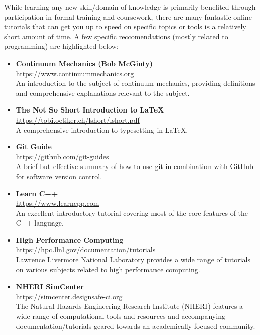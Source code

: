 \documentclass[12pt,a4paper,article,oneside]{memoir} %
\begin{document}
While learning any new skill/domain of knowledge is primarily benefited through participation in formal training and coursework, there are many fantastic online tutorials that can get you up to speed on specific topics or tools is a relatively short amount of time. A few specific reccomendations (mostly related to programming) are highlighted below:
\begin{itemize}
\item \textbf{Continuum Mechanics (Bob McGinty)} \\ \url{https://www.continuummechanics.org} \\ An introduction to the subject of continuum mechanics, providing definitions and comprehensive explanations relevant to the subject.
\item \textbf{The Not So Short Introduction to \LaTeX{}} \\ \url{https://tobi.oetiker.ch/lshort/lshort.pdf} \\ A comprehensive introduction to typesetting in \LaTeX{}.
\item \textbf{Git Guide} \\ \url{https://github.com/git-guides} \\ A brief but effective summary of how to use git in combination with GitHub for software version control.
\item \textbf{Learn C++} \\ \url{https://www.learncpp.com} \\ An excellent introductory tutorial covering most of the core features of the C++ language.
\item \textbf{High Performance Computing} \\ \url{https://hpc.llnl.gov/documentation/tutorials} \\ Lawrence Livermore National Laboratory provides a wide range of tutorials on various subjects related to high performance computing.
\item \textbf{NHERI SimCenter} \\ \url{https://simcenter.designsafe-ci.org} \\ The Natural Hazards Engineering Research Institute (NHERI) features a wide range of computational tools and resources and accompanying documentation/tutorials geared towards an academically-focused community.
\end{itemize}

\end{document}
